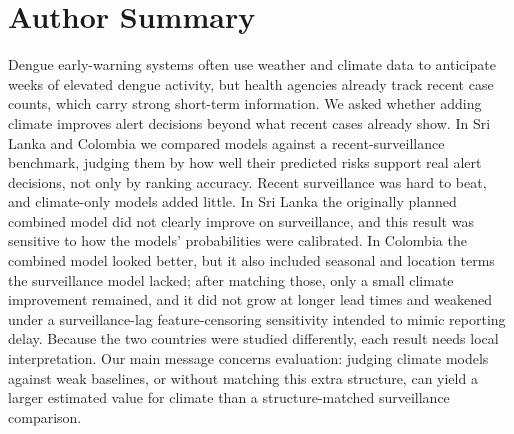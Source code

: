 \documentclass[11pt,a4paper]{article}
\begin{document}
\begin{abstract}
\noindent\textbf{Conclusions/Significance.}
Evaluations that benchmark climate against weak comparators or leave non-climate structure unmatched can overstate the decision value of climate data for dengue alerting. Benchmarked against recent surveillance, matched for structure, and judged by calibrated decision-curve net benefit, climate added little robust standalone value: Sri Lanka was null (and calibration-sensitive) and the small Colombia matched increment did not survive as robust, transportable evidence. The contribution is primarily methodological---benchmark against recent surveillance, match non-climate structure before attributing value to climate, and report calibration and threshold-averaged net benefit rather than discrimination against weak comparators. Local, setting-specific evaluation remains necessary.
\end{abstract}

\section*{Author Summary}
Dengue early-warning systems often use weather and climate data to anticipate weeks of elevated dengue activity, but health agencies already track recent case counts, which carry strong short-term information. We asked whether adding climate improves alert decisions beyond what recent cases already show. In Sri Lanka and Colombia we compared models against a recent-surveillance benchmark, judging them by how well their predicted risks support real alert decisions, not only by ranking accuracy. Recent surveillance was hard to beat, and climate-only models added little. In Sri Lanka the originally planned combined model did not clearly improve on surveillance, and this result was sensitive to how the models' probabilities were calibrated. In Colombia the combined model looked better, but it also included seasonal and location terms the surveillance model lacked; after matching those, only a small climate improvement remained, and it did not grow at longer lead times and weakened under a surveillance-lag feature-censoring sensitivity intended to mimic reporting delay. Because the two countries were studied differently, each result needs local interpretation. Our main message concerns evaluation: judging climate models against weak baselines, or without matching this extra structure, can yield a larger estimated value for climate than a structure-matched surveillance comparison.
\end{document}
